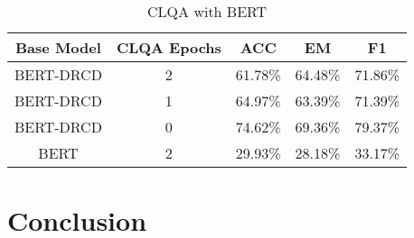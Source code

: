 \documentclass{article}
\begin{document}
\begin{table}[h!]
  \centering
  \caption{CLQA with BERT}
  \begin{tabular}{ccccc}
    Base Model & CLQA Epochs & ACC & EM & F1\\
    \toprule
    BERT-DRCD & 2 & 61.78\% & 64.48\% & 71.86\% \\
    BERT-DRCD & 1 & 64.97\% & 63.39\% & 71.39\% \\
    BERT-DRCD & 0 & 74.62\% & 69.36\% & 79.37\% \\
    BERT      & 2 & 29.93\% & 28.18\% & 33.17\% \\
  \end{tabular}
  \label{tab:bertclqa}
\end{table}

\section{Conclusion}

\newpage



\end{document}
